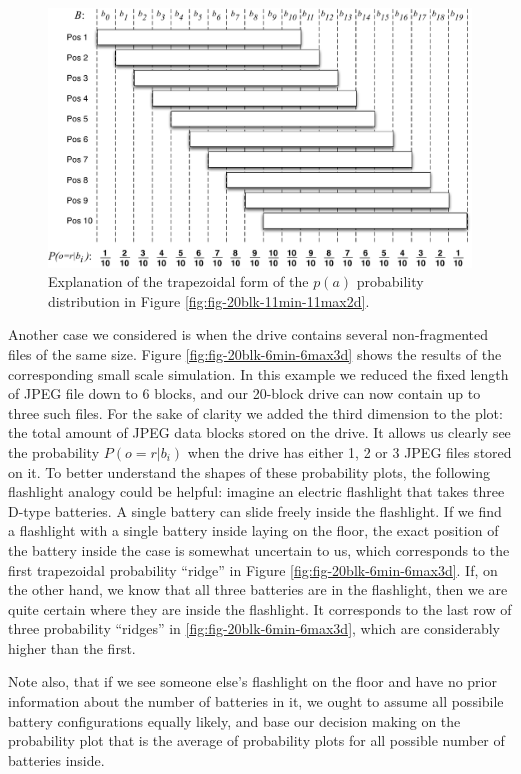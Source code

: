 \documentclass[final,5p,times,twocolumn,authoryear]{elsarticle}
\begin{document}
\begin{figure}
  \centerline{\includegraphics[width=\textwidth]{pa_explain.pdf}}
  \caption{Explanation of the trapezoidal form of the $p(a)$ probability distribution in Figure \ref{fig:fig-20blk-11min-11max2d}.}
  \label{fig:pa_explan}
\end{figure}

Another case we considered is when the drive contains several non-fragmented files of the same size. Figure \ref{fig:fig-20blk-6min-6max3d} shows the results of the corresponding small scale simulation. In this example we reduced the fixed length of JPEG file down to 6 blocks, and our 20-block drive can now contain up to three such files. For the sake of clarity we added the third dimension to the plot: the total amount of JPEG data blocks stored on the drive. It allows us clearly see the probability $P(o=r|b_i)$ when the drive has either 1, 2 or 3 JPEG files stored on it. To better understand the shapes of these probability plots, the following flashlight analogy could be helpful: imagine an electric flashlight that takes three D-type batteries. A single battery can slide freely inside the flashlight. If we find a flashlight with a single battery inside laying on the floor, the exact position of the battery inside the case is somewhat uncertain to us, which corresponds to the first trapezoidal probability ``ridge'' in Figure \ref{fig:fig-20blk-6min-6max3d}. If, on the other hand, we know that all three batteries are in the flashlight, then we are quite certain where they are inside the flashlight. It corresponds to the last row of three probability ``ridges'' in \ref{fig:fig-20blk-6min-6max3d}, which are considerably higher than the first.

Note also, that if we see someone else's flashlight on the floor and have no prior information about the number of batteries in it, we ought to assume all possibile battery configurations equally likely, and base our decision making on the probability plot that is the average of probability plots for all possible number of batteries inside.
\end{document}
